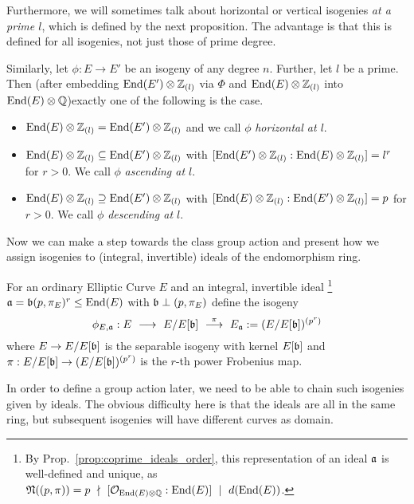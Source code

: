 Furthermore, we will sometimes talk about horizontal or vertical isogenies \emph{at a prime $l$}, which is defined by the next proposition.
The advantage is that this is defined for all isogenies, not just those of prime degree.
\begin{prop}
    Similarly, let $\phi: E \to E'$ be an isogeny of any degree $n$.
    Further, let $l$ be a prime.
    Then (after embedding $\mathrm{End}(E') \otimes \mathbb{Z}_{(l)}$ via $\Phi$ and $\mathrm{End}(E) \otimes \mathbb{Z}_{(l)}$ into $\mathrm{End}(E) \otimes \mathbb{Q}$)exactly one of the following is the case.
    \begin{itemize}
        \item $\mathrm{End}(E) \otimes \mathbb{Z}_{(l)} = \mathrm{End}(E') \otimes \mathbb{Z}_{(l)}$ and we call $\phi$ \emph{horizontal at $l$}.
        \item $\mathrm{End}(E) \otimes \mathbb{Z}_{(l)} \subseteq \mathrm{End}(E') \otimes \mathbb{Z}_{(l)}$ with $[\mathrm{End}(E') \otimes \mathbb{Z}_{(l)} : \mathrm{End}(E) \otimes \mathbb{Z}_{(l)}] = l^r$ for $r > 0$. We call $\phi$ \emph{ascending at $l$}.
        \item $\mathrm{End}(E) \otimes \mathbb{Z}_{(l)} \supseteq \mathrm{End}(E') \otimes \mathbb{Z}_{(l)}$ with $[\mathrm{End}(E) \otimes \mathbb{Z}_{(l)} : \mathrm{End}(E') \otimes \mathbb{Z}_{(l)}] = p$ for $r > 0$. We call $\phi$ \emph{descending at $l$}.
    \end{itemize}
\end{prop}
Now we can make a step towards the class group action and present how we assign isogenies to (integral, invertible) ideals of the endomorphism ring.
\begin{definition}
    For an ordinary Elliptic Curve $E$ and an integral, invertible ideal
    \footnote{By Prop.~\ref{prop:coprime_ideals_order}, this representation of an ideal $\mathfrak{a}$ is well-defined and unique, as $\mathfrak{N}((p, \pi)) = p \ \nmid \  [\mathcal{O}_{\mathrm{End}(E) \otimes \mathbb{Q}} : \mathrm{End}(E)] \ \mid \  d(\mathrm{End}(E))$.}
    $\mathfrak{a} = \mathfrak{b}(p, \pi_E)^r \leq \mathrm{End}(E)$ with $\mathfrak{b} \perp (p, \pi_E)$ define the isogeny
    \begin{equation*}
        \phi_{E, \mathfrak{a}}: E \ \longrightarrow \ E/E[\mathfrak{b}] \ \overset{\pi}{\longrightarrow} \ E_{\mathfrak{a}} := (E/E[\mathfrak{b}])^{(p^r)}
    \end{equation*}
    where $E \to E/E[\mathfrak{b}]$ is the separable isogeny with kernel $E[\mathfrak{b}]$ and $\pi: E/E[\mathfrak{b}] \to (E/E[\mathfrak{b}])^{(p^r)}$ is the $r$-th power Frobenius map.
\end{definition}
In order to define a group action later, we need to be able to chain such isogenies given by ideals.
The obvious difficulty here is that the ideals are all in the same ring, but subsequent isogenies will have different curves as domain.
